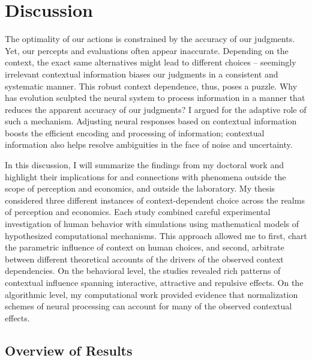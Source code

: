 \documentclass[a4paper, nobind]{templates/ociamthesis}
\begin{document}
\hypertarget{discussion-3}{%
\chapter{Discussion}\label{discussion-3}}

\minitoc

The optimality of our actions is constrained by the accuracy of our judgments. Yet, our percepts and evaluations often appear inaccurate. Depending on the context, the exact same alternatives might lead to different choices -- seemingly irrelevant contextual information biases our judgments in a consistent and systematic manner. This robust context dependence, thus, poses a puzzle. Why has evolution sculpted the neural system to process information in a manner that reduces the apparent accuracy of our judgments? I argued for the adaptive role of such a mechanism. Adjusting neural responses based on contextual information boosts the efficient encoding and processing of information; contextual information also helps resolve ambiguities in the face of noise and uncertainty.

In this discussion, I will summarize the findings from my doctoral work and highlight their implications for and connections with phenomena outside the scope of perception and economics, and outside the laboratory. My thesis considered three different instances of context-dependent choice across the realms of perception and economics. Each study combined careful experimental investigation of human behavior with simulations using mathematical models of hypothesized computational mechanisms. This approach allowed me to first, chart the parametric influence of context on human choices, and second, arbitrate between different theoretical accounts of the drivers of the observed context dependencies. On the behavioral level, the studies revealed rich patterns of contextual influence spanning interactive, attractive and repulsive effects. On the algorithmic level, my computational work provided evidence that normalization schemes of neural processing can account for many of the observed contextual effects.

\hypertarget{overview-of-results}{%
\section{Overview of Results}\label{overview-of-results}}
\end{document}
